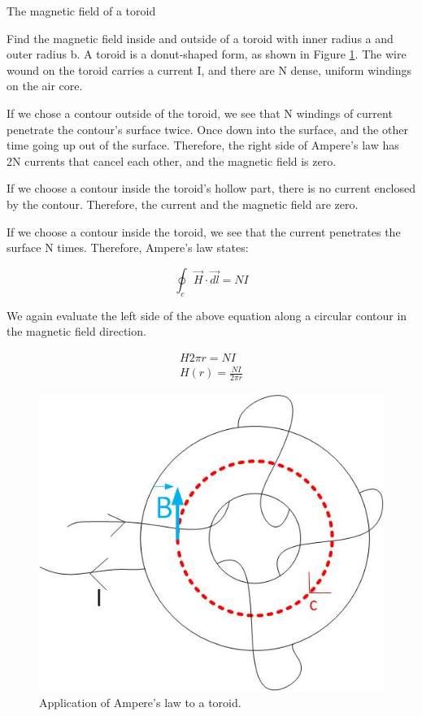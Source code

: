 \documentclass{ximera}
\begin{document}
\begin{example}
The magnetic field of a toroid

Find the magnetic field inside and outside of a toroid with inner radius a and outer radius b. A toroid is a donut-shaped form, as shown in Figure \ref{fig:toroid}. The wire wound on the toroid carries a current I, and there are N dense, uniform windings on the air core.


\begin{explanation}
 
If we chose a contour outside of the toroid, we see that N windings of current penetrate the contour's surface twice. Once down into the surface, and the other time going up out of the surface. Therefore, the right side of Ampere's law has 2N currents that cancel each other, and the magnetic field is zero.

If we choose a contour inside the toroid's hollow part, there is no current enclosed by the contour. Therefore, the current and the magnetic field are zero.

If we choose a contour inside the toroid, we see that the current penetrates the surface N times. Therefore, Ampere's law states:



\begin{equation}
\oint_c \vec{H} \cdot \vec{dl} = N I
\end{equation}

We again evaluate the left side of the above equation along a circular contour in the magnetic field direction.

\begin{eqnarray}
H 2 \pi r = N I \\
H(r) =\frac{N I}{ 2 \pi r}
\end{eqnarray}



\begin{figure}[htbp]
\begin{center}
\includegraphics[scale=0.5]{../jpg/toroid.jpg}
\end{center}
\caption{Application of Ampere's law to a toroid.}
\label{fig:toroid}
\end{figure}



\end{explanation}
\end{example}
\end{document}
